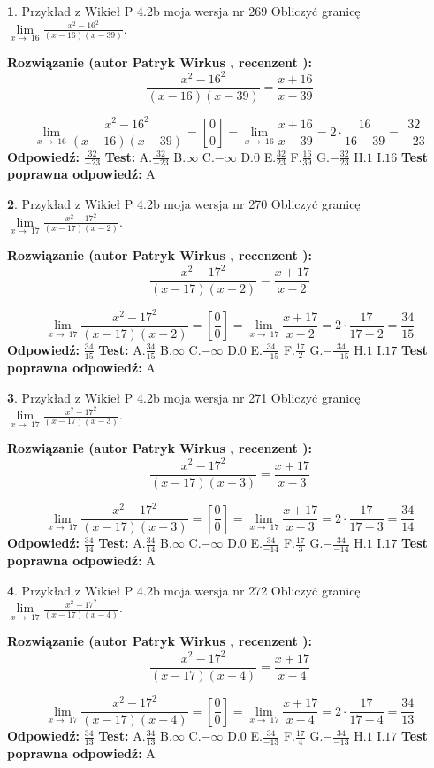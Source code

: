\documentclass[12pt, a4paper]{article}
\theoremstyle{definition} %
\newtheorem{zad}{}
\newcommand{\zadStart}[1]{\begin{zad}#1\newline}
\newcommand{\zadStop}{\end{zad}}
\newcommand{\rozwStart}[2]{\noindent \textbf{Rozwiązanie (autor #1 , recenzent #2): }\newline}
\newcommand{\rozwStop}{\newline}
\newcommand{\odpStart}{\noindent \textbf{Odpowiedź:}\newline}
\newcommand{\odpStop}{\newline}
\newcommand{\testStart}{\noindent \textbf{Test:}\newline}
\newcommand{\testStop}{\newline}
\newcommand{\kluczStart}{\noindent \textbf{Test poprawna odpowiedź:}\newline}
\newcommand{\kluczStop}{\newline}
\begin{document}
\zadStart{Przykład z Wikieł P 4.2b moja wersja nr 269}
Obliczyć granicę $\lim\limits_{x\to\ 16}\frac{x^{2}-16^{2}}{(x-16)(x-39)}$.
\zadStop
\rozwStart{Patryk Wirkus}{}
$$\frac{x^{2}-16^{2}}{(x-16)(x-39)}=\frac{x+16}{x-39}$$

$$\lim\limits_{x\to\ 16}\frac{x^{2}-16^{2}}{(x-16)(x-39)}=[\frac{0}{0}]=\lim\limits_{x\to\ 16}\frac{x+16}{x-39}=2 \cdot \frac{16}{16-39} = \frac{32}{-23}$$
\rozwStop
\odpStart
$\frac{32}{-23}$
\odpStop
\testStart
A.$\frac{32}{-23}$
B.$\infty$
C.$-\infty$
D.$0$
E.$\frac{32}{23}$
F.$\frac{16}{39}$
G.$-\frac{32}{23}$
H.$1$
I.$16$
\testStop
\kluczStart
A
\kluczStop



\zadStart{Przykład z Wikieł P 4.2b moja wersja nr 270}
Obliczyć granicę $\lim\limits_{x\to\ 17}\frac{x^{2}-17^{2}}{(x-17)(x-2)}$.
\zadStop
\rozwStart{Patryk Wirkus}{}
$$\frac{x^{2}-17^{2}}{(x-17)(x-2)}=\frac{x+17}{x-2}$$

$$\lim\limits_{x\to\ 17}\frac{x^{2}-17^{2}}{(x-17)(x-2)}=[\frac{0}{0}]=\lim\limits_{x\to\ 17}\frac{x+17}{x-2}=2 \cdot \frac{17}{17-2} = \frac{34}{15}$$
\rozwStop
\odpStart
$\frac{34}{15}$
\odpStop
\testStart
A.$\frac{34}{15}$
B.$\infty$
C.$-\infty$
D.$0$
E.$\frac{34}{-15}$
F.$\frac{17}{2}$
G.$-\frac{34}{-15}$
H.$1$
I.$17$
\testStop
\kluczStart
A
\kluczStop



\zadStart{Przykład z Wikieł P 4.2b moja wersja nr 271}
Obliczyć granicę $\lim\limits_{x\to\ 17}\frac{x^{2}-17^{2}}{(x-17)(x-3)}$.
\zadStop
\rozwStart{Patryk Wirkus}{}
$$\frac{x^{2}-17^{2}}{(x-17)(x-3)}=\frac{x+17}{x-3}$$

$$\lim\limits_{x\to\ 17}\frac{x^{2}-17^{2}}{(x-17)(x-3)}=[\frac{0}{0}]=\lim\limits_{x\to\ 17}\frac{x+17}{x-3}=2 \cdot \frac{17}{17-3} = \frac{34}{14}$$
\rozwStop
\odpStart
$\frac{34}{14}$
\odpStop
\testStart
A.$\frac{34}{14}$
B.$\infty$
C.$-\infty$
D.$0$
E.$\frac{34}{-14}$
F.$\frac{17}{3}$
G.$-\frac{34}{-14}$
H.$1$
I.$17$
\testStop
\kluczStart
A
\kluczStop



\zadStart{Przykład z Wikieł P 4.2b moja wersja nr 272}
Obliczyć granicę $\lim\limits_{x\to\ 17}\frac{x^{2}-17^{2}}{(x-17)(x-4)}$.
\zadStop
\rozwStart{Patryk Wirkus}{}
$$\frac{x^{2}-17^{2}}{(x-17)(x-4)}=\frac{x+17}{x-4}$$

$$\lim\limits_{x\to\ 17}\frac{x^{2}-17^{2}}{(x-17)(x-4)}=[\frac{0}{0}]=\lim\limits_{x\to\ 17}\frac{x+17}{x-4}=2 \cdot \frac{17}{17-4} = \frac{34}{13}$$
\rozwStop
\odpStart
$\frac{34}{13}$
\odpStop
\testStart
A.$\frac{34}{13}$
B.$\infty$
C.$-\infty$
D.$0$
E.$\frac{34}{-13}$
F.$\frac{17}{4}$
G.$-\frac{34}{-13}$
H.$1$
I.$17$
\testStop
\kluczStart
A
\kluczStop
\end{document}
